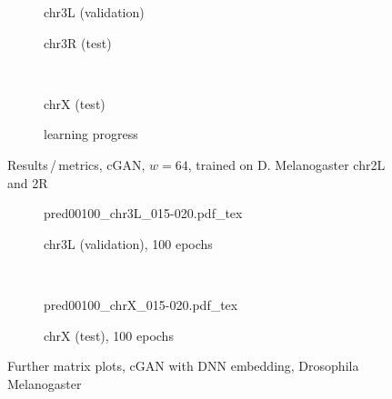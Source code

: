 \begin{figure}[p] %
    \begin{subfigure}{0.45\textwidth}
        \scriptsize
        \caption{chr3L (validation)}
    \end{subfigure} \hfill
    \begin{subfigure}{0.45\textwidth}
        \scriptsize
        \caption{chr3R (test)}
    \end{subfigure}\\[5mm]
    \begin{subfigure}{0.45\textwidth}
        \scriptsize
        \caption{chrX (test)}
    \end{subfigure}\hfill
    \begin{subfigure}{0.45\textwidth}
        \scriptsize
        \caption{learning progress} \label{fig:appendix:GAN64_drosophila_progress}
    \end{subfigure}
    \caption{Results\,/\,metrics, cGAN, $w=64$, trained on D. Melanogaster chr2L and 2R}   \label{fig:appendix:GAN64_drosophila_pearson}
\end{figure}
\begin{figure}[htbp]
\begin{subfigure}{\textwidth}
 \centering
 \scriptsize
 {pred00100_chr3L_015-020.pdf_tex}
 \caption{chr3L (validation), 100 epochs}
\end{subfigure}\\[5mm]
\begin{subfigure}{\textwidth}
 \centering
 \scriptsize
 {pred00100_chrX_015-020.pdf_tex}
 \caption{chrX (test), 100 epochs}
\end{subfigure}
\caption{Further matrix plots, cGAN with DNN embedding, Drosophila Melanogaster} \label{fig:appendix:GAN64_drosophila_matrices}
\end{figure}

